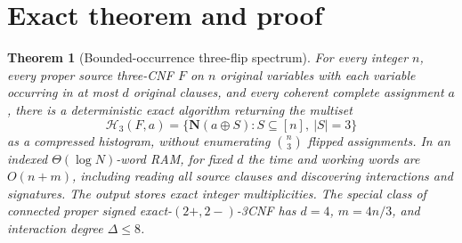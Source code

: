 \documentclass[11pt]{article}
\newtheorem{theorem}{Theorem}
\newcommand{\vv}[1]{\boldsymbol{#1}}
\begin{document}
\section{Exact theorem and proof}
\begin{theorem}[Bounded-occurrence three-flip spectrum]\label{thm:main}
For every integer $n$, every proper source three-CNF $F$ on $n$ original variables with each variable occurring in at most $d$ original clauses, and every coherent complete assignment $a$, there is a deterministic exact algorithm returning the multiset
\[\mathcal H_3(F,a)=\{\vv N(a\oplus S):S\subseteq[n],\ |S|=3\}\]
as a compressed histogram, without enumerating $\binom n3$ flipped assignments. In an indexed $\Theta(\log N)$-word RAM, for fixed $d$ the time and working words are $O(n+m)$, including reading all source clauses and discovering interactions and signatures. The output stores exact integer multiplicities. The special class of connected proper signed exact-$(2+,2-)$-3CNF has $d=4$, $m=4n/3$, and interaction degree $\Delta\le8$.
\end{theorem}
\end{document}
